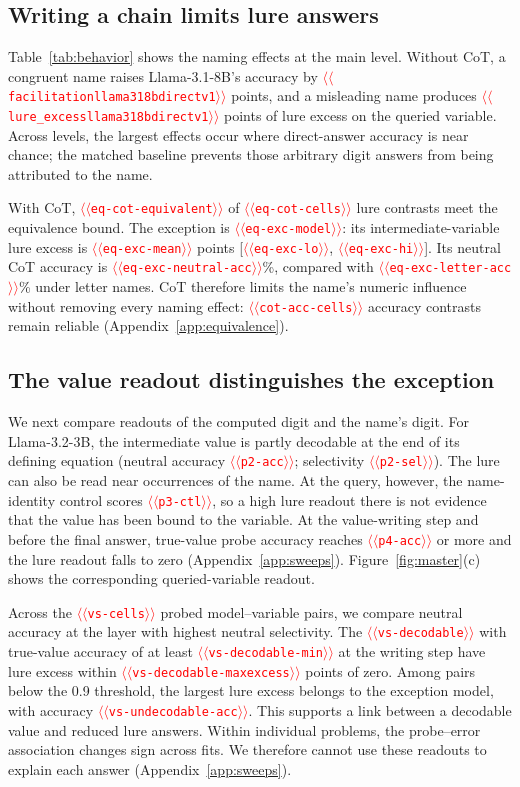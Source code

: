 \documentclass[11pt]{article}
\providecommand{\NUM}[1]{\textcolor{red}{$\langle\langle$\texttt{#1}$\rangle\rangle$}}
\begin{document}
\subsection{Writing a chain limits lure answers}

Table~\ref{tab:behavior} shows the naming effects at the main level. Without CoT, a congruent
name raises Llama-3.1-8B's accuracy by \NUM{facilitationllama318bdirectv1} points, and a
misleading name produces \NUM{lure_excessllama318bdirectv1} points of lure excess on the queried
variable. Across levels, the largest effects occur where direct-answer accuracy is near chance; the matched baseline prevents those arbitrary digit answers from being attributed to
the name.

With CoT, \NUM{eq-cot-equivalent} of \NUM{eq-cot-cells} lure contrasts meet the equivalence
bound. The exception is \NUM{eq-exc-model}: its intermediate-variable lure excess is
\NUM{eq-exc-mean} points [\NUM{eq-exc-lo}, \NUM{eq-exc-hi}]. Its neutral CoT accuracy is
\NUM{eq-exc-neutral-acc}\%, compared with \NUM{eq-exc-letter-acc}\% under letter names.
CoT therefore limits the name's numeric influence without removing every naming effect:
\NUM{cot-acc-cells} accuracy contrasts remain reliable
(Appendix~\ref{app:equivalence}).



\subsection{The value readout distinguishes the exception}

We next compare readouts of the computed digit and the name's digit.
For Llama-3.2-3B, the intermediate value is partly decodable at the end of its defining equation
(neutral accuracy \NUM{p2-acc}; selectivity \NUM{p2-sel}). The lure can also be read near occurrences of
the name. At the query, however, the name-identity control scores \NUM{p3-ctl}, so a high lure
readout there is not evidence that the value has been bound to the variable. At the value-writing
step and before the final answer, true-value probe accuracy reaches \NUM{p4-acc} or more and the
lure readout falls to zero (Appendix~\ref{app:sweeps}). Figure~\ref{fig:master}(c) shows the
corresponding queried-variable readout.

Across the \NUM{vs-cells} probed model--variable pairs, we compare neutral accuracy at the
layer with highest neutral selectivity. The \NUM{vs-decodable} with true-value accuracy of at least \NUM{vs-decodable-min} at the
writing step have lure excess within \NUM{vs-decodable-maxexcess} points of zero. Among pairs below the 0.9 threshold, the largest lure excess belongs to the exception model,
with accuracy \NUM{vs-undecodable-acc}. This supports a
link between a decodable value and reduced lure answers. Within individual problems, the probe--error association changes sign across fits. We
therefore cannot use these readouts to explain each answer (Appendix~\ref{app:sweeps}).
\end{document}
